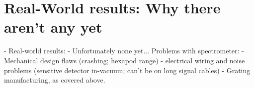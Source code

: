 \chapter{Real-World results: Why there aren't any yet}

- Real-world results:
     - Unfortunately none yet... Problems with spectrometer:
          - Mechanical design flaws (crashing; hexapod range)
          - electrical wiring and noise problems (sensitive detector in-vacuum; can't be on long signal cables)
          - Grating manufacturing, as covered above.

